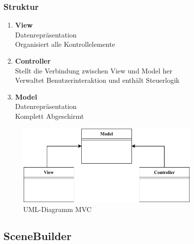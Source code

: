 \subsubsection{Struktur}

\begin{enumerate}
    \item \textbf{View}  \\
    Datenrepräsentation\\
    Organisiert alle Kontrollelemente
    \item \textbf{Controller} \\
    Stellt die Verbindung zwischen View und Model her\\
    Verwaltet Benutzerinteraktion und enthält Steuerlogik
    \item \textbf{Model} \\
    Datenrepräsentation\\
    Komplett Abgeschirmt
\end{enumerate}
\begin{figure}[H]
    \centering
    \includegraphics[width=0.8\textwidth]{fig/ainf/ModelViewController.pdf}
    \caption{UML-Diagramm MVC}
    \label{fig:UML-Diagramm MVC}
\end{figure}
\subsection{SceneBuilder}\label{subsec:scenebuilder}
